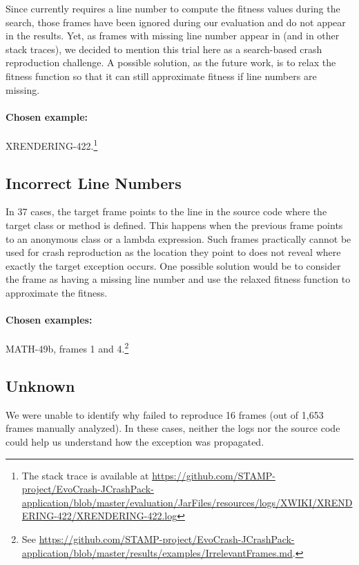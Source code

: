 Since \evocrash currently requires a line number to compute the fitness values during the search, those frames have been ignored during our evaluation and do not appear in the results.
Yet, as frames with missing line number appear in \crashpack (and in other stack traces), we decided to mention this trial here as a search-based crash reproduction challenge.
A possible solution, as the future work, is to relax the fitness function so that it can still approximate fitness if line numbers are missing.

\paragraph{Chosen example:} 
XRENDERING-422.\footnote{The stack trace is available at \url{https://github.com/STAMP-project/EvoCrash-JCrashPack-application/blob/master/evaluation/JarFiles/resources/logs/XWIKI/XRENDERING-422/XRENDERING-422.log}}


\subsection{Incorrect Line Numbers}

In 37 cases, the target frame points to the line in the source code where the target class or method is defined.
This happens when the previous frame points to an anonymous class or a lambda expression.
Such frames practically cannot be used for crash reproduction as the location they point to does not reveal where exactly the target exception occurs.
One possible solution would be to consider the frame as having a missing line number and use the relaxed fitness function to approximate the fitness. 

\paragraph{Chosen examples:} 
MATH-49b, frames 1 and 4.\footnote{See \url{https://github.com/STAMP-project/EvoCrash-JCrashPack-application/blob/master/results/examples/IrrelevantFrames.md}.}


\subsection{Unknown}

We were unable to identify why \evocrash failed to reproduce 16 frames (out of 1,653 frames manually analyzed). 
In these cases, neither the logs nor the source code could help us understand how the exception was propagated. 


